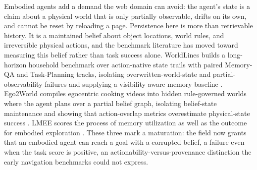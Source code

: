 Embodied agents add a demand the web domain can avoid: the agent's state is a claim about a physical world that is only partially observable, drifts on its own, and cannot be reset by reloading a page. Persistence here is more than retrievable history. It is a maintained belief about object locations, world rules, and irreversible physical actions, and the benchmark literature has moved toward measuring this belief rather than task success alone. WorldLines builds a long-horizon household benchmark over action-native state trails with paired Memory-QA and Task-Planning tracks, isolating overwritten-world-state and partial-observability failures and supplying a visibility-aware memory baseline \citep{zhang2026worldlines}. Ego2World compiles egocentric cooking videos into hidden rule-governed worlds where the agent plans over a partial belief graph, isolating belief-state maintenance and showing that action-overlap metrics overestimate physical-state success \citep{cheng2026ego2world}. LMEE scores the process of memory utilization as well as the outcome for embodied exploration \citep{wang2026lmee}. These three mark a maturation: the field now grants that an embodied agent can reach a goal with a corrupted belief, a failure even when the task score is positive, an actionability-versus-provenance distinction the early navigation benchmarks could not express.

